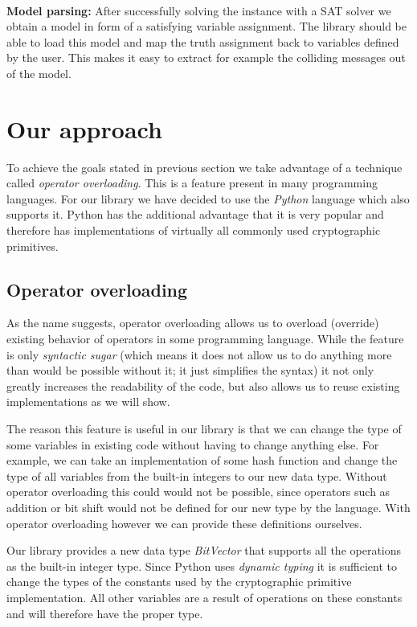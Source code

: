 ~\\
\textbf{Model parsing:}
After successfully solving the instance with a SAT solver we obtain a model in form of a satisfying variable assignment.
The library should be able to load this model and map the truth assignment back to variables defined by the user.
This makes it easy to extract for example the colliding messages out of the model.


\section{Our approach}
To achieve the goals stated in previous section we take advantage of a technique called \emph{operator overloading}.
This is a feature present in many programming languages.
For our library we have decided to use the \emph{Python} language which also supports it.
Python has the additional advantage that it is very popular and therefore has implementations of virtually all commonly used cryptographic primitives.

\subsection{Operator overloading}
\label{sec:operator-overloading}
As the name suggests, operator overloading allows us to overload (override) existing behavior of operators in some programming language.
While the feature is only \emph{syntactic sugar} (which means it does not allow us to do anything more than would be possible without it; it just simplifies the syntax) it not only greatly increases the readability of the code, but also allows us to reuse existing implementations as we will show.

The reason this feature is useful in our library is that we can change the type of some variables in existing code without having to change anything else.
For example, we can take an implementation of some hash function and change the type of all variables from the built-in integers to our new data type.
Without operator overloading this could would not be possible, since operators such as addition or bit shift would not be defined for our new type by the language.
With operator overloading however we can provide these definitions ourselves.

Our library provides a new data type \emph{BitVector} that supports all the operations as the built-in integer type.
Since Python uses \emph{dynamic typing} it is sufficient to change the types of the constants used by the cryptographic primitive implementation.
All other variables are a result of operations on these constants and will therefore have the proper type.

